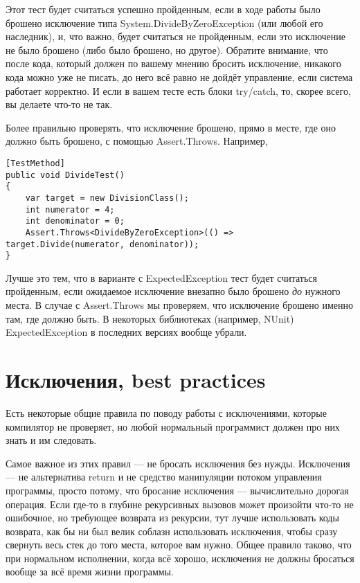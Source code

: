 \documentclass{../../text-style}
\begin{document}
Этот тест будет считаться успешно пройденным, если в ходе работы было брошено исключение типа System.DivideByZeroException (или любой его наследник), и, что важно, будет считаться не пройденным, если это исключение не было брошено (либо было брошено, но другое). Обратите внимание, что после кода, который должен по вашему мнению бросить исключение, никакого кода можно уже не писать, до него всё равно не дойдёт управление, если система работает корректно. И если в вашем тесте есть блоки try/catch, то, скорее всего, вы делаете что-то не так.

Более правильно проверять, что исключение брошено, прямо в месте, где оно должно быть брошено, с помощью Assert.Throws. Например,

\begin{verbatim}
[TestMethod]
public void DivideTest()
{
    var target = new DivisionClass();
    int numerator = 4;
    int denominator = 0;
    Assert.Throws<DivideByZeroException>(() => target.Divide(numerator, denominator));
}
\end{verbatim}

Лучше это тем, что в варианте с ExpectedException тест будет считаться пройденным, если ожидаемое исключение внезапно было брошено \emph{до} нужного места. В случае с Assert.Throws мы проверяем, что исключение брошено именно там, где должно быть. В некоторых библиотеках (например, NUnit) ExpectedException в последних версиях вообще убрали.

\section{Исключения, best practices}

Есть некоторые общие правила по поводу работы с исключениями, которые компилятор не проверяет, но любой нормальный программист должен про них знать и им следовать.

Самое важное из этих правил --- не бросать исключения без нужды. Исключения --- не альтернатива return и не средство манипуляции потоком управления программы, просто потому, что бросание исключения --- вычислительно дорогая операция. Если где-то в глубине рекурсивных вызовов может произойти что-то не ошибочное, но требующее возврата из рекурсии, тут лучше использовать коды возврата, как бы ни был велик соблазн использовать исключения, чтобы сразу свернуть весь стек до того места, которое вам нужно. Общее правило таково, что при нормальном исполнении, когда всё хорошо, исключения не должны бросаться вообще за всё время жизни программы.
\end{document}
